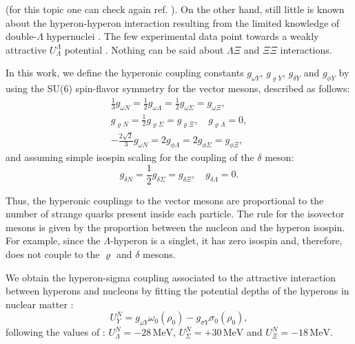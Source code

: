 \documentclass[twocolumn,showpacs,aps]{revtex4}
\begin{document}
\cite{Fukuda:1998bi,Khaustov:1999bz,SchaffnerBielich:2000wj} 
(for this topic one can check again ref. \cite{Friedman:2007zza}).
On the other hand, still little is known about the hyperon-hyperon interaction 
resulting from the limited knowledge of double-$\Lambda$ hypernuclei \cite{Gal:2003ze, Ahn:2013poa}.
The few experimental data point towards a weakly attractive $U_{\Lambda}^{\Lambda}$ potential \cite{Takahashi:2001nm,Gal:2011tb, Ahn:2013poa}. 
Nothing can be said about ${\Lambda}{\Xi}$ and ${\Xi}{\Xi}$ interactions. 


In this work, we define the hyperonic coupling constants $g_{\omega Y}$, $g_{\varrho Y}$, $g_{\delta Y}$ and $g_{\phi Y}$ by using
the SU(6) spin-flavor symmetry \cite{Dover:1985ba,Schaffner:1993qj} for the vector mesons, described as follows:
\begin{equation}\begin{split}
\label{hys}
\frac{1}{3}g_{\omega N}= \frac{1}{2}g_{\omega \Lambda}=\frac{1}{2} g_{\omega \Sigma}=  g_{\omega \Xi}, \\
g_{\varrho N}=\frac{1}{2} g_{\varrho \Sigma}=g_{\varrho \Xi}, \quad g_{\varrho \Lambda} = 0, \\
-\frac{2\sqrt{2}}{3} g_{\omega N}= 2 g_{\phi \Lambda}= 2 g_{\phi \Sigma}= g_{\phi \Xi},
\end{split}\end{equation}
and assuming simple isospin scaling for the coupling of the $\delta$ meson:
\begin{equation}
g_{\delta N}=\frac{1}{2} g_{\delta \Sigma}=g_{\delta \Xi}, \quad g_{\delta \Lambda} = 0.
\end{equation}

Thus, the hyperonic couplings to the vector mesons are proportional to the number of strange quarks present inside each particle.
The rule for the isovector mesons is given by the proportion between the nucleon and the hyperon isospin. 
For example, since the $\Lambda$-hyperon is a singlet, it has zero isospin and, therefore,
does not couple to the $\varrho$ and $\delta$ mesons.

We obtain the hyperon-sigma coupling associated to the attractive interaction between hyperons and nucleons
by fitting the potential depths of the hyperons in nuclear matter \cite{Glendenning:1991es,Schaffner:1992sn}: 
\begin{equation}
\label{potentials}
U_Y^N= g_{\omega Y} \omega_0(\rho_0) - g_{\sigma Y} \sigma_0(\rho_0),
\end{equation}
following the values of \cite{SchaffnerBielich:2000wj}:
$U_{\Lambda}^N =-28\, \mathrm{MeV}$, $U_{\Sigma}^N=+ 30\, \mathrm{MeV}$ and $U_{\Xi}^N= -18\, \mathrm{MeV}$. 
\end{document}
